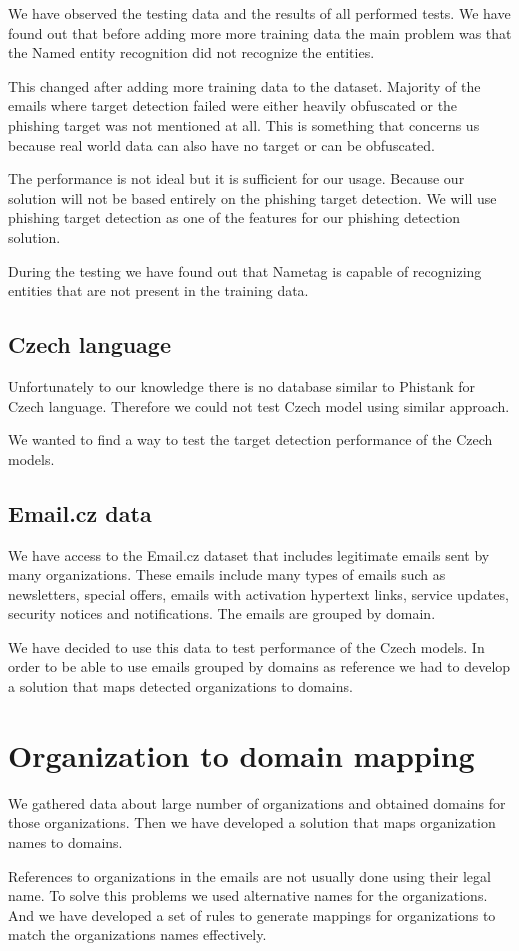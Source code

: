 \documentclass[thesis=B,english]{FITthesis}[2012/10/20]
\begin{document}
\par We have observed the testing data and the results of all performed tests. We have found out that before adding more more training data the main problem was that the Named entity recognition did not recognize the entities.
\par This changed after adding more training data to the dataset. Majority of the emails where target detection failed were either heavily obfuscated or the phishing target was not mentioned at all. This is something that concerns us because real world data can also have no target or can be obfuscated.
\par The performance is not ideal but it is sufficient for our usage. Because our solution will not be based entirely on the phishing target detection. We will use phishing target detection as one of the features for our phishing detection solution. 
\par During the testing we have found out that Nametag is capable of recognizing entities that are not present in the training data.

\subsection{Czech language}
Unfortunately to our knowledge there is no database similar to Phistank for Czech language. Therefore we could not test Czech model using similar approach. 
\par We wanted to find a way to test the target detection performance of the Czech models. 

\subsection{Email.cz data}
We have access to the Email.cz dataset that includes legitimate emails sent by many organizations. These emails include many types of emails such as newsletters, special offers, emails with activation hypertext links, service updates, security notices and notifications. The emails are grouped by domain.
\par We have decided to use this data to test performance of the Czech models. In order to be able to use emails grouped by domains as reference we had to develop a solution that maps detected organizations to domains.

\section{Organization to domain mapping}
We gathered data about large number of organizations and obtained domains for those organizations.
Then we have developed a solution that maps organization names to domains. 
\par References to organizations in the emails are not usually done using their legal name.
To solve this problems we used alternative names for the organizations. And we have developed a set of rules to generate mappings for organizations to match the organizations names effectively. 
\end{document}
